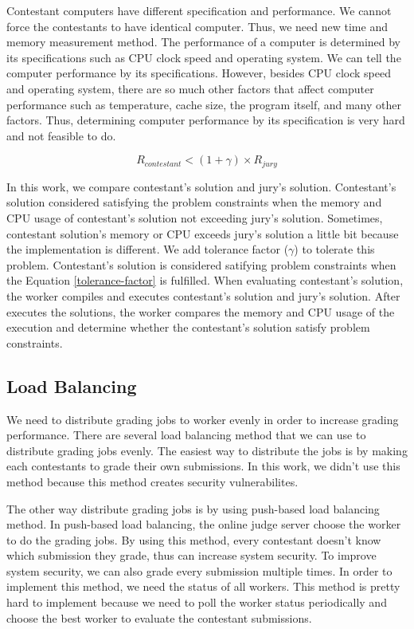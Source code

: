 \documentclass[conference]{IEEEtran}
\begin{document}
Contestant computers have different specification and performance. We cannot force the contestants to have identical computer. Thus, we need new time and memory measurement method. The performance of a computer is determined by its specifications such as CPU clock speed and operating system. We can tell the computer performance by its specifications. However, besides CPU clock speed and operating system, there are so much other factors that affect computer performance such as temperature, cache size, the program itself, and many other factors. Thus, determining computer performance by its specification is very hard and not feasible to do.

\begin{equation}\label{tolerance-factor}
R_{contestant} < (1 + \gamma) \times R_{jury}
\end{equation}

In this work, we compare contestant's solution and jury's solution. Contestant's solution considered satisfying the problem constraints when the memory and CPU usage of contestant's solution not exceeding jury's solution. Sometimes, contestant solution's memory or CPU exceeds jury's solution a little bit because the implementation is different. We add tolerance factor ($\gamma$) to tolerate this problem. Contestant's solution is considered satifying problem constraints when the Equation \ref{tolerance-factor} is fulfilled. When evaluating contestant's solution, the worker compiles and executes contestant's solution and jury's solution. After executes the solutions, the worker compares the memory and CPU usage of the execution and determine whether the contestant's solution satisfy problem constraints. 

\subsection{Load Balancing}

We need to distribute grading jobs to worker evenly in order to increase grading performance. There are several load balancing method that we can use to distribute grading jobs evenly. The easiest way to distribute the jobs is by making each contestants to grade their own submissions. In this work, we didn't use this method because this method creates security vulnerabilites.

The other way distribute grading jobs is by using push-based load balancing method. In push-based load balancing, the online judge server choose the worker to do the grading jobs. By using this method, every contestant doesn't know which submission they grade, thus can increase system security. To improve system security, we can also grade every submission multiple times. In order to implement this method, we need the status of all workers. This method is pretty hard to implement because we need to poll the worker status periodically and choose the best worker to evaluate the contestant submissions.
\end{document}
